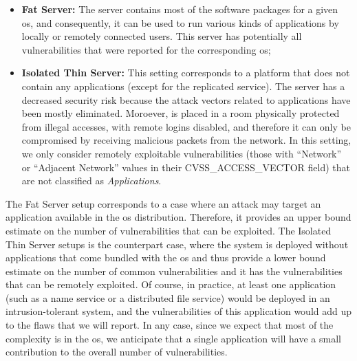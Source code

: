 \begin{itemize}

\item \textbf{Fat Server:} The server contains most of the software packages for a given \gls{os}, and consequently, it can be used to run various kinds of applications by locally or remotely connected users. This server has potentially all vulnerabilities that were reported for the corresponding \gls{os};


\item \textbf{Isolated Thin Server:} This setting corresponds to a platform that does not contain any applications (except for the replicated service). 
The server has a decreased security risk because the attack vectors related to applications have been mostly eliminated. 
Moroever, is placed in a room physically protected from illegal accesses, with remote logins disabled, and therefore it can only be compromised by receiving malicious packets from the network. In this setting, we only consider remotely exploitable vulnerabilities (those with ``Network'' or ``Adjacent Network'' values in their CVSS\_ACCESS\_VECTOR field) that are not classified as \textit{Applications}.

\end{itemize}

The Fat Server setup corresponds to a case where an attack may target an application available in the \gls{os} distribution. 
Therefore, it provides an upper bound estimate on the number of vulnerabilities that can be exploited. 
The Isolated Thin Server setups is the counterpart case, where the system is deployed without applications that come bundled with the \gls{os} and thus provide a lower bound estimate on the number of common vulnerabilities and it has the vulnerabilities that can be remotely exploited. 
Of course, in practice, at least one application (such as a name service or a distributed file service) would be deployed in an intrusion-tolerant system, and the vulnerabilities of this application would add up to the flaws that we will report. 
In any case, since we expect that most of the complexity is in the \gls{os}, we anticipate that a single application will have a small contribution to the overall number of vulnerabilities.



